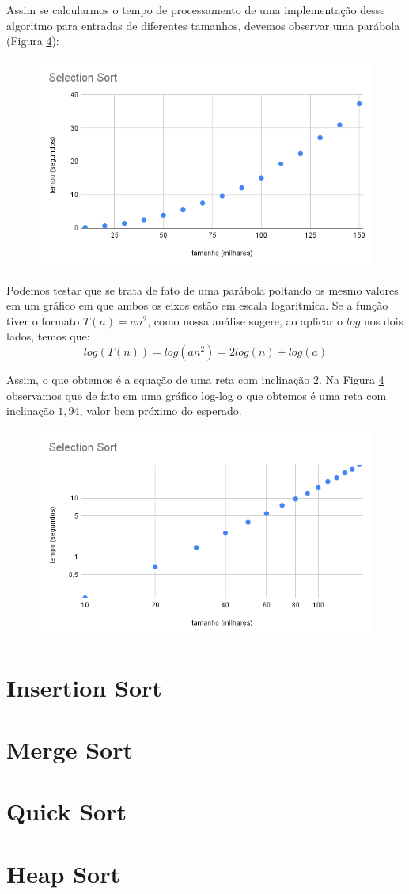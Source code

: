   Assim se calcularmos o tempo de processamento de uma implementação desse algoritmo para entradas de diferentes tamanhos, devemos observar uma parábola (Figura \ref{}):

  \begin{figure}
    \includegraphics[width=\textwidth]{imagens/SelectionSort1.png}
  \end{figure}

  Podemos testar que se trata de fato de uma parábola poltando os mesmo valores em um gráfico em que ambos os eixos estão em escala logarítmica.
  Se a função tiver o formato $T(n) = an^2$, como nossa análise sugere, ao aplicar o $log$ nos dois lados, temos que:
  \begin{displaymath}
  log(T(n)) = log(an^2) = 2log(n) + log(a)
  \end{displaymath}
  
  Assim, o que obtemos é a equação de uma reta com inclinação $2$.
  Na Figura \ref{} observamos que de fato em uma gráfico log-log o que obtemos é uma reta com inclinação $1,94$, valor bem próximo do esperado.

  \begin{figure}
    \includegraphics[width=\textwidth]{imagens/SelectionSort2.png}
  \end{figure}

  
\section{Insertion Sort}
\section{Merge Sort}
\section{Quick Sort}
\section{Heap Sort}

